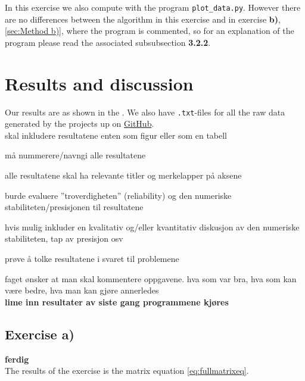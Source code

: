 \documentclass{article}
\begin{document}
    In this exercise we also compute with the program \texttt{plot\_data.py}. However there are no differences between the algorithm in this exercise and in exercise \textbf{b)}, \ref{sec:Method b)}, where the program is commented, so for an explanation of the program please read the associated subsubsection \textbf{3.2.2}.



\vspace{1cm}

\section{Results and discussion} \label{sec:Results}

  Our results are as shown in the . We also have \texttt{.txt}-files for all the raw data generated by the projects up on \href{https://github.com/Erikbgram/Fys3150}{GitHub}. \\

  skal inkludere resultatene enten som figur eller som en tabell

  må nummerere/navngi alle resultatene

  alle resultatene skal ha relevante titler og merkelapper på aksene

  burde evaluere ''troverdigheten'' (reliability) og den numeriske stabiliteten/presisjonen til resultatene

  hvis mulig inkluder en kvalitativ og/eller kvantitativ diskusjon av den numeriske stabiliteten, tap av presisjon osv

  prøve å tolke resultatene i svaret til problemene

  faget ønsker at man skal kommentere oppgavene. hva som var bra, hva som kan være bedre, hva man kan gjøre annerledes \\

  {\bf lime inn resultater av siste gang programmene kjøres} \\

  \subsection{Exercise a)} \label{sec:Results a)}

    {\bf ferdig} \\

    The results of the exercise is the matrix equation \ref{eq:fullmatrixeq}.
\end{document}

